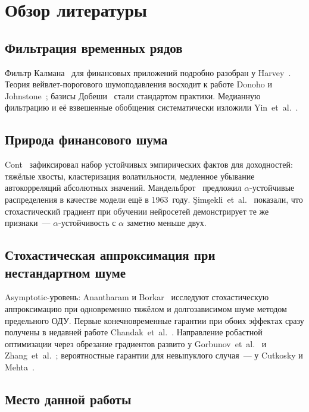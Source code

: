 \documentclass[conference]{IEEEtran}
\begin{document}
\section{Обзор литературы}
\label{sec:related}

\subsection{Фильтрация временных рядов}

Фильтр Калмана~\cite{kalman1960} для финансовых приложений подробно
разобран у Harvey~\cite{harvey1990kalmanfinance}. Теория вейвлет-порогового
шумоподавления восходит к работе Donoho и Johnstone~\cite{donoho1994wavelets};
базисы Добеши~\cite{daubechies1992wavelets} стали стандартом практики.
Медианную фильтрацию и её взвешенные обобщения систематически изложили
Yin~et~al.~\cite{yin1996median}.

\subsection{Природа финансового шума}

Cont~\cite{cont2001} зафиксировал набор устойчивых эмпирических фактов
для доходностей: тяжёлые хвосты, кластеризация волатильности, медленное
убывание автокорреляций абсолютных значений. Мандельброт~\cite{mandelbrot1963}
предложил $\alpha$-устойчивые распределения в качестве модели ещё в
1963~году. \c{S}im\c{s}ekli~et~al.~\cite{simsekli2019tailindex} показали,
что стохастический градиент при обучении нейросетей демонстрирует те же
признаки~--- $\alpha$-устойчивость с $\alpha$ заметно меньше двух.

\subsection{Стохастическая аппроксимация при нестандартном шуме}

Asymptotic-уровень: Anantharam и Borkar~\cite{anantharam2012sa} исследуют
стохастическую аппроксимацию при одновременно тяжёлом и долгозависимом
шуме методом предельного ОДУ. Первые
конечновременные гарантии при обоих эффектах сразу получены в недавней
работе Chandak~et~al.~\cite{chandak2026hl}. Направление робастной
оптимизации через обрезание градиентов развито у Gorbunov~et~al.~\cite{gorbunov2020clipping}
и Zhang~et~al.~\cite{zhang2020clipping}; вероятностные гарантии для
невыпуклого случая~--- у Cutkosky и Mehta~\cite{cutkosky2021high}.

\subsection{Место данной работы}
\end{document}
